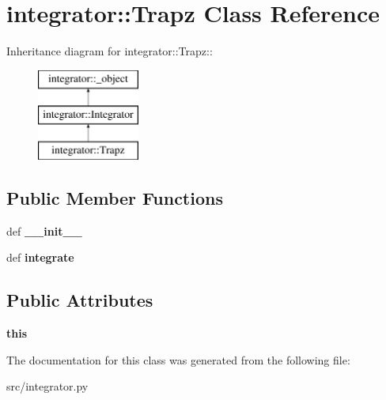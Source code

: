 \hypertarget{classintegrator_1_1Trapz}{
\section{integrator::Trapz Class Reference}
\label{db/dc8/classintegrator_1_1Trapz}
}
Inheritance diagram for integrator::Trapz::\begin{figure}[H]
\begin{center}
\leavevmode
\includegraphics[height=3cm]{db/dc8/classintegrator_1_1Trapz}
\end{center}
\end{figure}
\subsection*{Public Member Functions}
\begin{DoxyCompactItemize}
\item 
\hypertarget{classintegrator_1_1Trapz_a20001d1505a9f9f5d6412e707c99a28c}{
def {\bfseries \_\-\_\-init\_\-\_\-}}
\label{db/dc8/classintegrator_1_1Trapz_a20001d1505a9f9f5d6412e707c99a28c}

\item 
\hypertarget{classintegrator_1_1Trapz_af8fade81b71ebd43ea4d8c93b7dbc490}{
def {\bfseries integrate}}
\label{db/dc8/classintegrator_1_1Trapz_af8fade81b71ebd43ea4d8c93b7dbc490}

\end{DoxyCompactItemize}
\subsection*{Public Attributes}
\begin{DoxyCompactItemize}
\item 
\hypertarget{classintegrator_1_1Trapz_a591c3fae4b831990a14bf6ac6203d599}{
{\bfseries this}}
\label{db/dc8/classintegrator_1_1Trapz_a591c3fae4b831990a14bf6ac6203d599}

\end{DoxyCompactItemize}


The documentation for this class was generated from the following file:\begin{DoxyCompactItemize}
\item 
src/integrator.py\end{DoxyCompactItemize}
